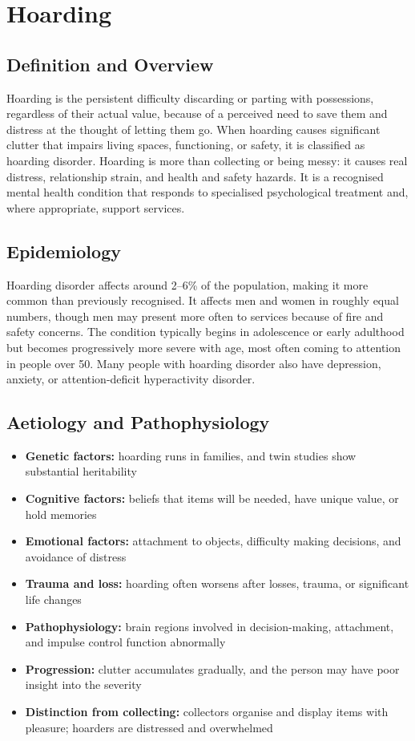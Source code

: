 \chapter{Hoarding}

\section*{Definition and Overview}
Hoarding is the persistent difficulty discarding or parting with possessions, regardless of their actual value, because of a perceived need to save them and distress at the thought of letting them go. When hoarding causes significant clutter that impairs living spaces, functioning, or safety, it is classified as hoarding disorder. Hoarding is more than collecting or being messy: it causes real distress, relationship strain, and health and safety hazards. It is a recognised mental health condition that responds to specialised psychological treatment and, where appropriate, support services.

\section*{Epidemiology}
Hoarding disorder affects around 2--6\% of the population, making it more common than previously recognised. It affects men and women in roughly equal numbers, though men may present more often to services because of fire and safety concerns. The condition typically begins in adolescence or early adulthood but becomes progressively more severe with age, most often coming to attention in people over 50. Many people with hoarding disorder also have depression, anxiety, or attention-deficit hyperactivity disorder.

\section*{Aetiology and Pathophysiology}
\begin{itemize}
    \item \textbf{Genetic factors:} hoarding runs in families, and twin studies show substantial heritability
    \item \textbf{Cognitive factors:} beliefs that items will be needed, have unique value, or hold memories
    \item \textbf{Emotional factors:} attachment to objects, difficulty making decisions, and avoidance of distress
    \item \textbf{Trauma and loss:} hoarding often worsens after losses, trauma, or significant life changes
    \item \textbf{Pathophysiology:} brain regions involved in decision-making, attachment, and impulse control function abnormally
    \item \textbf{Progression:} clutter accumulates gradually, and the person may have poor insight into the severity
    \item \textbf{Distinction from collecting:} collectors organise and display items with pleasure; hoarders are distressed and overwhelmed
\end{itemize}

